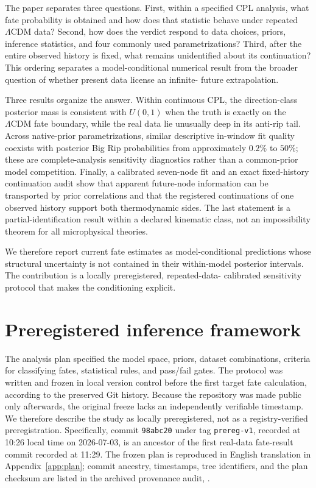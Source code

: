 \documentclass[a4paper,11pt]{article}
\newcommand{\lcdm}{\ensuremath{\Lambda\mathrm{CDM}}}
\begin{document}
The paper separates three questions. First, within a specified CPL analysis,
what fate probability is obtained and how does that statistic behave under
repeated \lcdm{} data? Second, how does the verdict respond to data choices,
priors, inference statistics, and four commonly used parametrizations? Third,
after the entire observed history is fixed, what remains unidentified about
its continuation? This ordering separates a model-conditional numerical
result from the broader question of whether present data license an infinite-
future extrapolation.

Three results organize the answer. Within continuous CPL, the direction-class
posterior mass is consistent with $U(0,1)$ when the truth is exactly on the
\lcdm{} fate boundary, while the real data lie unusually deep in its anti-rip
tail. Across native-prior parametrizations, similar descriptive in-window fit
quality coexists with posterior Big Rip probabilities from approximately
$0.2\%$ to $50\%$; these are complete-analysis sensitivity diagnostics rather
than a common-prior model competition. Finally, a calibrated seven-node fit
and an exact fixed-history continuation audit show that apparent future-node
information can be transported by prior correlations and that the registered
continuations of one observed history support both thermodynamic sides. The
last statement is a partial-identification result within a declared kinematic
class, not an impossibility theorem for all microphysical theories.

We therefore report current fate estimates as model-conditional predictions
whose structural uncertainty is not contained in their within-model posterior
intervals. The contribution is a locally preregistered, repeated-data-
calibrated sensitivity protocol that makes the conditioning explicit.

\section{Preregistered inference framework}\label{sec:prereg}

The analysis plan specified the model space, priors, dataset combinations,
criteria for classifying fates, statistical rules, and pass/fail gates. The
protocol was written and frozen in local version control before the first
target fate calculation, according to the preserved Git history. Because the
repository was made public only afterwards, the original freeze lacks an
independently verifiable timestamp. We therefore describe the study as locally
preregistered, not as a registry-verified preregistration. Specifically, commit
\texttt{98abc20} under tag
\texttt{prereg-v1}, recorded at 10:26 local time on 2026-07-03, is an ancestor
of the first real-data fate-result commit recorded at 11:29. The frozen plan is
reproduced in English translation in Appendix~\ref{app:plan}; commit ancestry,
timestamps, tree identifiers, and the plan checksum are listed in the archived
provenance audit, .
\end{document}
